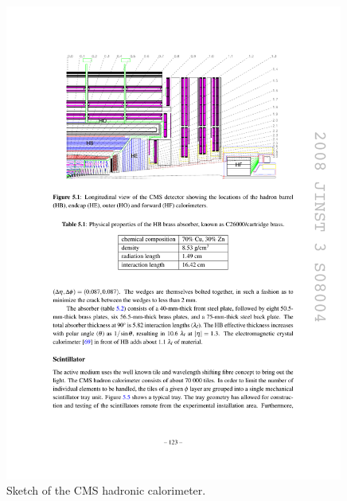 \begin{figure}[h]
\centering 
\includegraphics[width=0.99\textwidth]{figures/cms_hcal}\hfil
\caption{Sketch of the CMS hadronic calorimeter. }
\label{fig:cms_hcal}
\end{figure}


